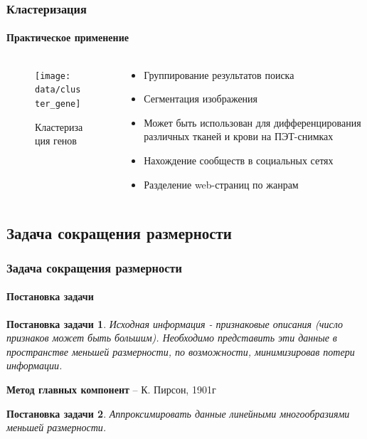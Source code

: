 \documentclass[xcolor=table]{beamer}
\newtheorem{prob}{Постановка задачи}
\begin{document}
\begin{frame}
  \frametitle{Кластеризация}
  \framesubtitle{Практическое применение}

  \begin{columns}
    \begin{column}{0.4\textwidth}
      \begin{figure}
        \texttt{[image: data/cluster\_gene]}
        \caption{Кластеризация генов}
        \end{figure}
    \end{column}
    
    \begin{column}{0.6\textwidth}
      \begin{itemize}
      \item Группирование результатов поиска
      \item Сегментация изображения
      \item Может быть использован для дифференцирования различных тканей и крови на ПЭТ-снимках
      \item Нахождение сообществ в социальных сетях
      \item Разделение web-страниц по жанрам
      \end{itemize}
    \end{column}
  \end{columns}
\end{frame}

\subsection{Задача сокращения размерности}
\begin{frame}
  \frametitle{Задача сокращения размерности}
  \framesubtitle{Постановка задачи}

  \begin{prob}
    Исходная информация - признаковые описания (число признаков может быть большим).
    Необходимо представить эти данные в пространстве меньшей размерности, по возможности, минимизировав потери информации.
  \end{prob}
  \vspace{15pt}
  \textbf{Метод главных компонент} -- К. Пирсон, 1901г
  \vspace{5pt}
  \begin{prob}
    Аппроксимировать данные линейными многообразиями меньшей размерности.
  \end{prob}
\end{frame}
\end{document}
